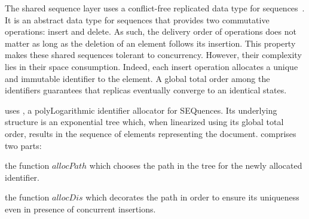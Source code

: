 \begin{asparadesc}
\item [The shared sequence layer] uses a conflict-free replicated data type for
  sequences~\cite{shapiro2011comprehensive, shapiro2011conflict}. It is an
  abstract data type for sequences that provides two commutative operations:
  insert and delete. As such, the delivery order of operations does not matter
  as long as the deletion of an element follows its insertion. This property
  makes these shared sequences tolerant to concurrency. However, their
  complexity lies in their space consumption. Indeed, each insert operation
  allocates a unique and immutable identifier to the element. A global total
  order among the identifiers guarantees that replicas eventually converge to an
  identical states.

  \CRATE uses \LSEQ, a polyLogarithmic identifier allocator for SEQuences. Its
  underlying structure is an exponential tree which, when linearized using its
  global total order, results in the sequence of elements representing the
  document. \LSEQ comprises two parts:
  \begin{inparaenum}[(i)]
  \item the function $allocPath$ which chooses the path in the tree for the
    newly allocated identifier.
  \item the function $allocDis$ which decorates the path in order to ensure its
    uniqueness even in presence of concurrent insertions.
  \end{inparaenum}


\end{asparadesc}
